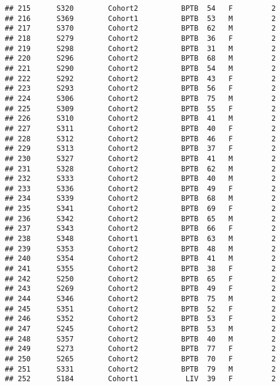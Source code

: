 \documentclass[
]{article}
\begin{document}
\begin{verbatim}
## 215      S320        Cohort2          BPTB  54   F         2      
## 216      S369        Cohort1          BPTB  53   M         2      
## 217      S370        Cohort2          BPTB  62   M         2      
## 218      S279        Cohort2          BPTB  36   F         2      
## 219      S298        Cohort2          BPTB  31   M         2      
## 220      S296        Cohort2          BPTB  68   M         2      
## 221      S290        Cohort2          BPTB  54   M         2      
## 222      S292        Cohort2          BPTB  43   F         2      
## 223      S293        Cohort2          BPTB  56   F         2      
## 224      S306        Cohort2          BPTB  75   M         2      
## 225      S309        Cohort2          BPTB  55   F         2      
## 226      S310        Cohort2          BPTB  41   M         2      
## 227      S311        Cohort2          BPTB  40   F         2      
## 228      S312        Cohort2          BPTB  46   F         2      
## 229      S313        Cohort2          BPTB  37   F         2      
## 230      S327        Cohort2          BPTB  41   M         2      
## 231      S328        Cohort2          BPTB  62   M         2      
## 232      S333        Cohort2          BPTB  40   M         2      
## 233      S336        Cohort2          BPTB  49   F         2      
## 234      S339        Cohort2          BPTB  68   M         2      
## 235      S341        Cohort2          BPTB  69   F         2      
## 236      S342        Cohort2          BPTB  65   M         2      
## 237      S343        Cohort2          BPTB  66   F         2      
## 238      S348        Cohort1          BPTB  63   M         2      
## 239      S353        Cohort2          BPTB  48   M         2      
## 240      S354        Cohort2          BPTB  41   M         2      
## 241      S355        Cohort2          BPTB  38   F         2      
## 242      S250        Cohort2          BPTB  65   F         2      
## 243      S269        Cohort2          BPTB  49   F         2      
## 244      S346        Cohort2          BPTB  75   M         2      
## 245      S351        Cohort2          BPTB  52   F         2      
## 246      S352        Cohort2          BPTB  53   F         2      
## 247      S245        Cohort2          BPTB  53   M         2      
## 248      S357        Cohort2          BPTB  40   M         2      
## 249      S273        Cohort2          BPTB  77   F         2      
## 250      S265        Cohort2          BPTB  70   F         2      
## 251      S331        Cohort2          BPTB  79   M         2      
## 252      S184        Cohort1           LIV  39   F         2      

\end{verbatim}
\end{document}
